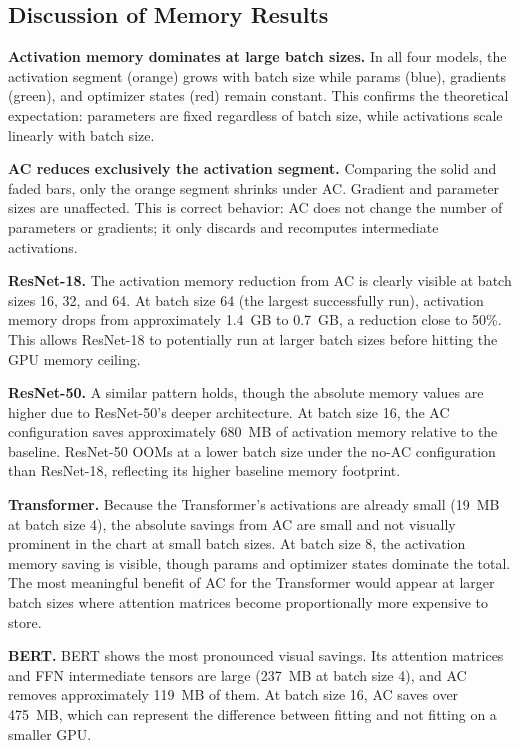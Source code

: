 \documentclass[11pt]{article}
\begin{document}
\subsection{Discussion of Memory Results}

\textbf{Activation memory dominates at large batch sizes.} In all four
models, the activation segment (orange) grows with batch size while
params (blue), gradients (green), and optimizer states (red) remain
constant. This confirms the theoretical expectation: parameters are
fixed regardless of batch size, while activations scale linearly with
batch size.

\textbf{AC reduces exclusively the activation segment.} Comparing the
solid and faded bars, only the orange segment shrinks under AC. Gradient
and parameter sizes are unaffected. This is correct behavior: AC does not
change the number of parameters or gradients; it only discards and
recomputes intermediate activations.

\textbf{ResNet-18.} The activation memory reduction from AC is clearly
visible at batch sizes 16, 32, and 64. At batch size 64 (the largest
successfully run), activation memory drops from approximately 1.4~GB to
0.7~GB, a reduction close to 50\%. This allows ResNet-18 to potentially
run at larger batch sizes before hitting the GPU memory ceiling.

\textbf{ResNet-50.} A similar pattern holds, though the absolute memory
values are higher due to ResNet-50's deeper architecture. At batch size
16, the AC configuration saves approximately 680~MB of activation memory
relative to the baseline. ResNet-50 OOMs at a lower batch size under the
no-AC configuration than ResNet-18, reflecting its higher baseline memory
footprint.

\textbf{Transformer.} Because the Transformer's activations are already
small (19~MB at batch size 4), the absolute savings from AC are small and
not visually prominent in the chart at small batch sizes. At batch size 8,
the activation memory saving is visible, though params and optimizer states
dominate the total. The most meaningful benefit of AC for the Transformer
would appear at larger batch sizes where attention matrices become
proportionally more expensive to store.

\textbf{BERT.} BERT shows the most pronounced visual savings. Its
attention matrices and FFN intermediate tensors are large (237~MB at batch
size 4), and AC removes approximately 119~MB of them. At batch size 16,
AC saves over 475~MB, which can represent the difference between fitting
and not fitting on a smaller GPU.
\end{document}
